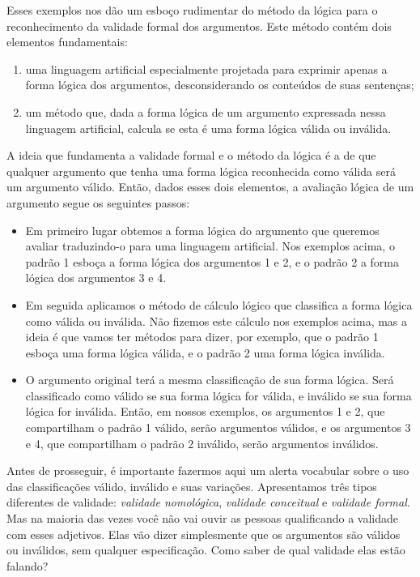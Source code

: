 Esses exemplos nos dão um esboço rudimentar do método da lógica para o reconhecimento da validade formal dos argumentos.
Este método contém dois elementos fundamentais:
\begin{enumerate}
	\item  uma linguagem artificial especialmente projetada para exprimir apenas a forma lógica dos argumentos, desconsiderando os conteúdos de suas sentenças;
	\item um método que, dada a forma lógica de um argumento expressada nessa linguagem artificial, calcula se esta é uma forma lógica válida ou inválida.
\end{enumerate}
A ideia que fundamenta a validade formal e o método da lógica é a de que qualquer argumento que tenha uma forma lógica reconhecida como válida será um argumento válido.
Então, dados esses dois elementos, a avaliação lógica de um argumento segue os seguintes passos:
\begin{itemize}
	\item Em primeiro lugar obtemos a forma lógica do argumento que queremos avaliar traduzindo-o para uma linguagem artificial. Nos exemplos acima, o padrão 1 esboça a forma lógica dos argumentos 1 e 2, e o padrão 2 a forma lógica dos argumentos 3 e 4.
	\item Em seguida aplicamos o método de cálculo lógico que classifica a forma lógica como válida ou inválida. Não fizemos este cálculo nos exemplos acima, mas a ideia é que vamos ter métodos para dizer, por exemplo, que o padrão 1 esboça uma forma lógica válida, e o padrão 2 uma forma lógica inválida.
	\item O argumento original terá a mesma classificação de sua forma lógica. Será classificado como válido se sua forma lógica for válida, e inválido se sua forma lógica for inválida. Então, em nossos exemplos, os argumentos 1 e 2, que compartilham o padrão 1 válido, serão argumentos válidos, e os argumentos 3 e 4, que compartilham o padrão 2 inválido, serão argumentos inválidos.
\end{itemize}
Antes de prosseguir, é importante fazermos aqui um alerta vocabular sobre o uso das classificações válido, inválido e suas variações.
Apresentamos três tipos diferentes de validade: \textit{validade nomológica}, \textit{validade conceitual} e \textit{validade formal}.
Mas na maioria das vezes você não vai ouvir as pessoas qualificando a validade com esses adjetivos.
Elas vão dizer simplesmente que os argumentos são válidos ou inválidos, sem qualquer especificação.
Como saber de qual validade elas estão falando?
